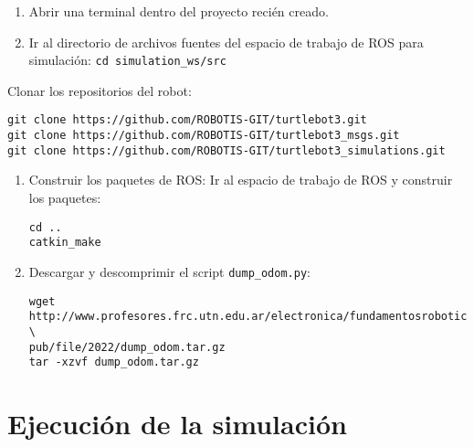 \documentclass[tp]{lcc}
\begin{document}
\begin{enumerate}
	\item Abrir una terminal dentro del proyecto recién creado.

	\item Ir al directorio de archivos fuentes del espacio de trabajo de ROS para simulación: \lstinline[style=bash]{cd simulation_ws/src}
\end{enumerate}

Clonar los repositorios del robot:
\begin{lstlisting}[style=bash] 
git clone https://github.com/ROBOTIS-GIT/turtlebot3.git
git clone https://github.com/ROBOTIS-GIT/turtlebot3_msgs.git
git clone https://github.com/ROBOTIS-GIT/turtlebot3_simulations.git
\end{lstlisting}

\begin{enumerate}
	\item Construir los paquetes de ROS: Ir al espacio de trabajo de ROS y construir los paquetes:

\begin{lstlisting}[style=bash] 
cd ..
catkin_make
\end{lstlisting}
	
	\item Descargar y descomprimir el script \lstinline[style=bash]{dump_odom.py}:
	
\begin{lstlisting}[style=bash] 
wget http://www.profesores.frc.utn.edu.ar/electronica/fundamentosroboticamovil/ \
pub/file/2022/dump_odom.tar.gz
tar -xzvf dump_odom.tar.gz
\end{lstlisting}
	
\end{enumerate}

\section{Ejecución de la simulación}
\end{document}
